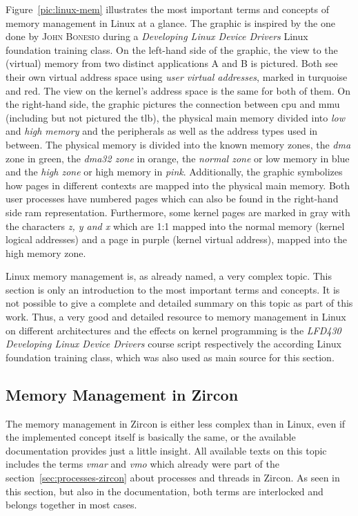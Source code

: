 Figure~\ref{pic:linux-mem} illustrates the most important terms and concepts of memory management in Linux at a glance.
The graphic is inspired by the one done by \textsc{John Bonesio} during a \textit{Developing Linux Device Drivers} Linux foundation training class.
On the left-hand side of the graphic, the view to the (virtual) memory from two distinct applications A and B is pictured.
Both see their own virtual address space using \textit{user virtual addresses}, marked in turquoise and red.
The view on the kernel's address space is the same for both of them.
On the right-hand side, the graphic pictures the connection between \ac{cpu} and \ac{mmu} (including but not pictured the \ac{tlb}),  the physical main memory divided into \textit{low} and \textit{high memory} and the peripherals as well as the address types used in between.
The physical memory is divided into the known memory zones, the \textit{\ac{dma}} zone in green, the \textit{\ac{dma}32 zone} in orange, the \textit{normal zone} or low memory in blue and the \textit{high zone} or high memory in \textit{pink}.
Additionally, the graphic symbolizes how pages in different contexts are mapped into the physical main memory.
Both user processes have numbered pages which can also be found in the right-hand side \ac{ram} representation.
Furthermore, some kernel pages are marked in gray with the characters \textit{z, y and x} which are 1:1 mapped into the normal memory (kernel logical addresses) and a page in purple (kernel virtual address), mapped into the high memory zone. 

Linux memory management is, as already named, a very complex topic.
This section is only an introduction to the most important terms and concepts.
It is not possible to give a complete and detailed summary on this topic as part of this work.
Thus, a very good and detailed resource to memory management in Linux on different architectures and the effects on kernel programming is the \textit{LFD430 Developing Linux Device Drivers} course script\cite{lfd430} respectively the according Linux foundation training class, which was also used as main source for this section. 
%

\subsection{Memory Management in Zircon} 
The memory management in Zircon is either less complex than in Linux, even if the implemented concept itself is basically the same, or the available documentation provides just a little insight.
All available texts on this topic includes the terms \textit{\acf{vmar}} and \textit{\acf{vmo}} which already were part of the section~\ref{sec:processes-zircon} about processes and threads in Zircon.
As seen in this section, but also in the documentation, both terms are interlocked and belongs together in most cases.

